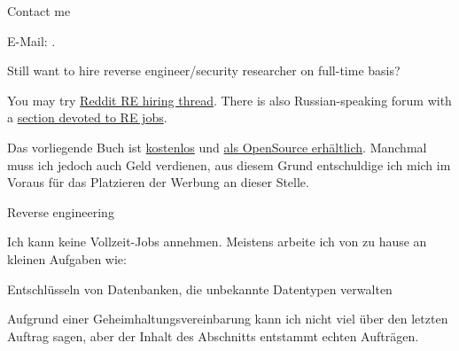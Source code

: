 \large Contact me \normalsize

E-Mail: \GTT{\EMAIL}.

\large Still want to hire reverse engineer/security researcher on full-time basis? \normalsize

You may try \href{https://www.reddit.com/r/ReverseEngineering/comments/49cza0/rreverseengineerings_2015_triannual_hiring_thread/}{Reddit RE hiring thread}.
There is also Russian-speaking forum with a \href{https://forum.reverse4you.org/forumdisplay.php?f=252}{section devoted to RE jobs}.

\fi %

\ifdefined\GERMAN

\bigskip
\bigskip
\bigskip

\huge
\normalsize

\bigskip
\bigskip
\bigskip

Das vorliegende Buch ist \href{http://beginners.re/}{kostenlos} und 
\href{https://github.com/dennis714/RE-for-beginners/}{als OpenSource erhältlich}.
Manchmal muss ich jedoch auch Geld verdienen, aus diesem Grund entschuldige ich mich im Voraus
für das Platzieren der Werbung an dieser Stelle.

\iffalse
\Large Benötigen Sie Dokumentation? \normalsize

Ich kann versuchen Dokumentationen, Referenzen und Handbücher für einige APIs,
Sprachen, Frameworks und so weiter zu schreiben.

Manchmal bin ich gut im Finden von präzisen und klaren Beispielen für jedes API-/Sprachfeature.
Dieses Buch ist ein Beispiel dafür.
Ich kann versuchen dies in einer ausführlichen und zuverlässigen Art zu tun.

Auf der anderen Seite ist mein Englisch weit entfernt fließend zu sein und
ich könnte lange brauchen um mich tief in Produkte einzuarbeiten die ich nicht kenne.

Aber wäre erfreut existierende Dokumentationsprojekte zu überarbeiten.
Eine Beispielreferenz die ich bewundere ist Wolfram Mathematica: \url{http://reference.wolfram.com/language/}.
\fi

\Large Reverse engineering \normalsize

Ich kann keine Vollzeit-Jobs annehmen. Meistens arbeite ich von zu hause an kleinen Aufgaben wie:

\large Entschlüsseln von Datenbanken, die unbekannte Datentypen verwalten \normalsize

Aufgrund einer Geheimhaltungsvereinbarung kann ich nicht viel über den letzten Auftrag
sagen, aber der Inhalt des Abschnitts  entstammt echten Aufträgen.

